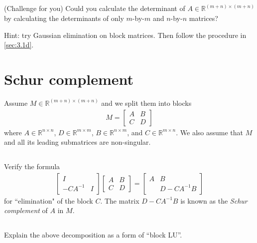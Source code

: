 \documentclass[11pt,letterpaper]{report}
\begin{document}
\subsection{}
(Challenge for you) Could you calculate the determinant of $A\in \mathbb{R}^{(m+n)\times(m+n)}$ by calculating the determinants of only $m$-by-$m$ and $n$-by-$n$ matrices? 

Hint: try Gaussian elimination on block matrices. Then follow the procedure in \ref{sec:3.1d}.

\section{Schur complement}
Assume $M\in \mathbb{R}^{(m+n)\times(m+n)}$ and we split them into blocks
\begin{align*}
    M = \begin{bmatrix}
    A &B\\
    C &D
    \end{bmatrix}
\end{align*}
where $A\in\mathbb{R}^{n\times n}$, $D\in\mathbb{R}^{m\times m}$, $B\in\mathbb{R}^{n\times m}$, and $C\in\mathbb{R}^{m\times n}$. We also assume that $M$ and all its leading submatrices are non-singular. 

\subsection{}
Verify the formula
\begin{align*}
     \begin{bmatrix}
    I & \\
    -CA^{-1} & I
    \end{bmatrix} \begin{bmatrix}
    A &B\\
    C &D
    \end{bmatrix} =  \begin{bmatrix}
    A &B\\
     &D-CA^{-1}B
    \end{bmatrix}
\end{align*}
for ``elimination" of the block $C$. The matrix $D-CA^{-1}B$ is  known as the \textit{Schur complement} of $A$ in $M$.

\subsection{}
Explain the above decomposition as a form of ``block LU''. 
\end{document}
